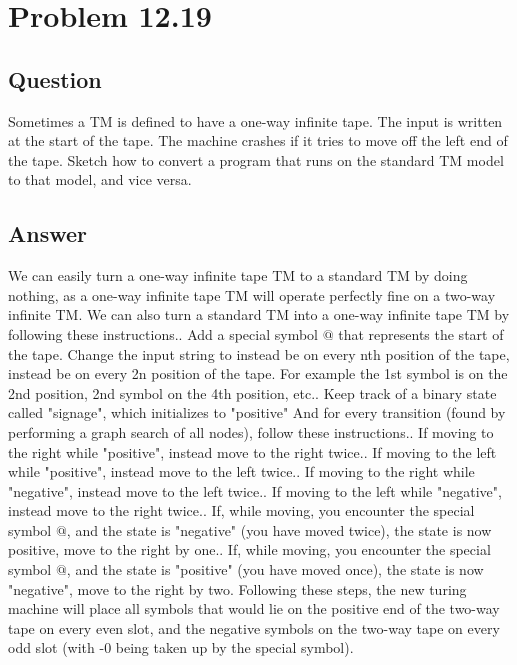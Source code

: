 \documentclass[12pt, a4paper]{article}
\begin{document}
\section{Problem 12.19}
\subsection{Question}
Sometimes a TM is defined to have a one-way infinite tape. The input is written at the start of the tape. The machine crashes if it tries to move off the left end of the tape.\newline
Sketch how to convert a program that runs on the standard TM model to that model, and vice versa.
\subsection{Answer}
We can easily turn a one-way infinite tape TM to a standard TM by doing nothing, as a one-way infinite tape TM will operate perfectly fine on a two-way infinite TM.\newline
\newline
We can also turn a standard TM into a one-way infinite tape TM by following these instructions.. Add a special symbol $@$ that represents the start of the tape. Change the input string to instead be on every nth position of the tape, instead be on every 2n position of the tape. For example the 1st symbol is on the 2nd position, 2nd symbol on the 4th position, etc.. Keep track of a binary state called "signage", which initializes to "positive"\newline
And for every transition (found by performing a graph search of all nodes), follow these instructions.. If moving to the right while "positive", instead move to the right twice.. If moving to the left while "positive", instead move to the left twice.. If moving to the right while "negative", instead move to the left twice.. If moving to the left while "negative", instead move to the right twice.. If, while moving, you encounter the special symbol $@$, and the state is "negative" (you have moved twice), the state is now positive, move to the right by one.. If, while moving, you encounter the special symbol $@$, and the state is "positive" (you have moved once), the state is now "negative", move to the right by two.\newline
\newline
Following these steps, the new turing machine will place all symbols that would lie on the positive end of the two-way tape on every even slot, and the negative symbols on the two-way tape on every odd slot (with -0 being taken up by the special symbol).
\end{document}
